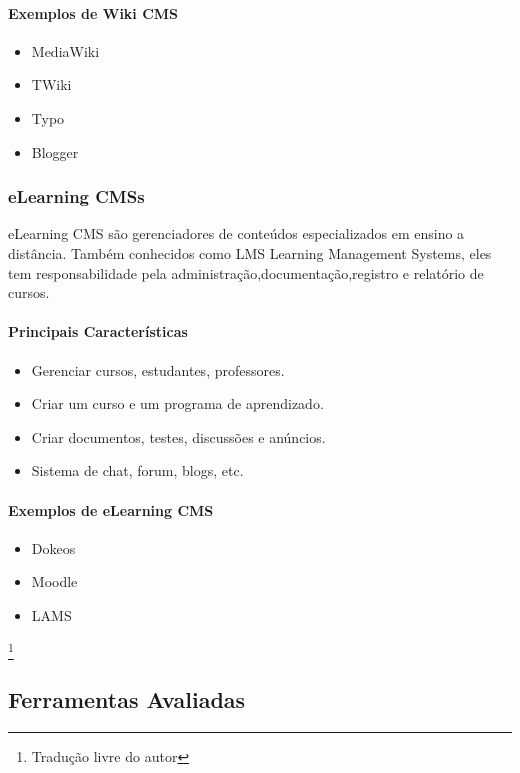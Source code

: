 \paragraph{Exemplos de Wiki CMS} 

\begin{itemize}
  \item MediaWiki
  \item TWiki
  \item Typo
  \item Blogger
\end{itemize}


\subsubsection{eLearning CMSs} 

eLearning CMS são gerenciadores de conteúdos especializados em ensino a distância. Também conhecidos como LMS Learning Management Systems, eles tem responsabilidade pela administração,documentação,registro e relatório de cursos.

\paragraph{Principais Características}

\begin{itemize}
  \item Gerenciar cursos, estudantes, professores.
  \item Criar um curso e um programa de aprendizado.
  \item Criar documentos, testes, discussões e anúncios.
  \item Sistema de chat, forum, blogs, etc.
\end{itemize}

\paragraph{Exemplos de eLearning CMS} 

\begin{itemize}
  \item Dokeos
  \item Moodle
  \item LAMS
\end{itemize}


\cite{choosing_open_source_cms}\footnote{Tradução livre do autor}

\subsection{Ferramentas Avaliadas}

